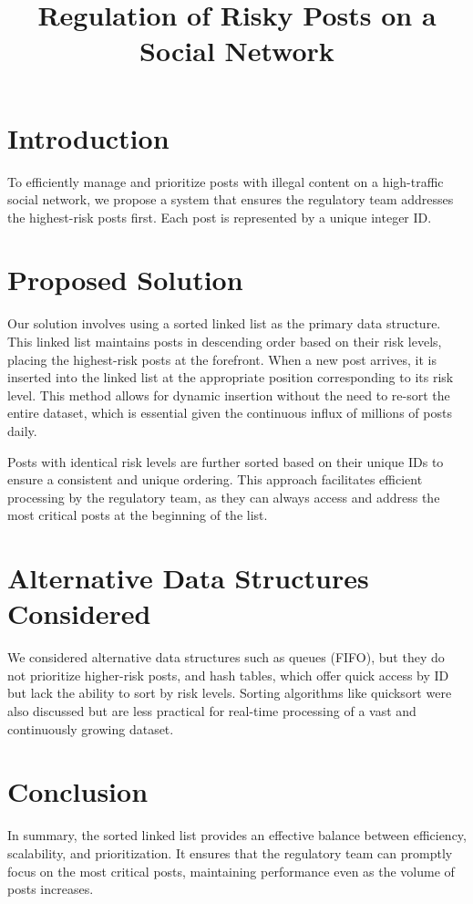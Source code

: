 \documentclass{article}
\begin{document}
\title{Regulation of Risky Posts on a Social Network}
\author{}
\date{}

\maketitle

\section{Introduction}

To efficiently manage and prioritize posts with illegal content on a high-traffic social network, we propose a system that ensures the regulatory team addresses the highest-risk posts first. Each post is represented by a unique integer ID.

\section{Proposed Solution}

Our solution involves using a sorted linked list as the primary data structure. This linked list maintains posts in descending order based on their risk levels, placing the highest-risk posts at the forefront. When a new post arrives, it is inserted into the linked list at the appropriate position corresponding to its risk level. This method allows for dynamic insertion without the need to re-sort the entire dataset, which is essential given the continuous influx of millions of posts daily.

Posts with identical risk levels are further sorted based on their unique IDs to ensure a consistent and unique ordering. This approach facilitates efficient processing by the regulatory team, as they can always access and address the most critical posts at the beginning of the list.

\section{Alternative Data Structures Considered}

We considered alternative data structures such as queues (FIFO), but they do not prioritize higher-risk posts, and hash tables, which offer quick access by ID but lack the ability to sort by risk levels. Sorting algorithms like quicksort were also discussed but are less practical for real-time processing of a vast and continuously growing dataset.

\section{Conclusion}

In summary, the sorted linked list provides an effective balance between efficiency, scalability, and prioritization. It ensures that the regulatory team can promptly focus on the most critical posts, maintaining performance even as the volume of posts increases.
\end{document}
